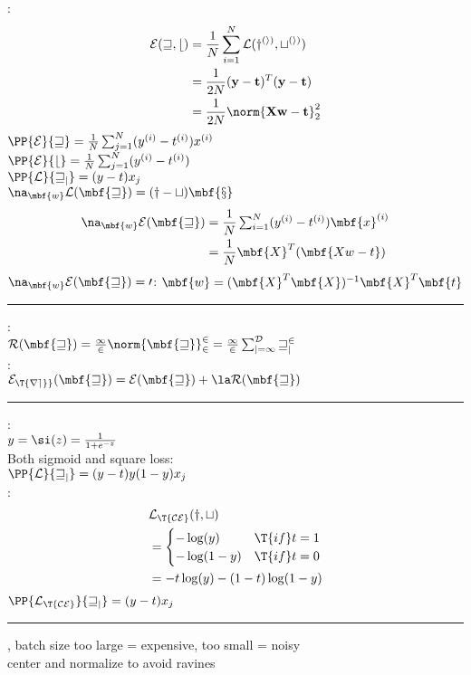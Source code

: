 \documentclass[10pt]{LatexTemplate/hw}
\begin{document}
\begin{multicols*}{5}
: \begin{align*}
    \cal{E}(w,b)&=\frac1N\sum_{i=1}^N \cal{L}(y^{(i)}, t^{(i)})\\
    &=\frac1{2N}(\mathbf{y}-\mathbf{t})^T(\mathbf{y}-\mathbf{t})\\
    &=\frac1{2N}\norm{\mathbf{Xw-t}}_2^2
\end{align*}
$\PP{\cal{E}}{w}=\frac1{N}\sum_{j=1}^N (y^{(i)}-t^{(i)})x^{(i)}$\\
$\PP{\cal{E}}{b}=\frac1{N}\sum_{j=1}^N (y^{(i)}-t^{(i)})$\\
$\PP{\cal{L}}{w_j}=(y-t)x_j$\\
$\na_\mbf{w} \cal{L}(\mbf{w}) = (y-t)\mbf{x}$
\begin{align*}
    \na_\mbf{w} \cal{E}(\mbf{w}) &= \frac1N \textstyle\sum_{i=1}^N (y^{(i)}-t^{(i)})\mbf{x}^{(i)}\\
    &= \frac1N \mbf{X}^T(\mbf{Xw-t})
\end{align*}
$\na_\mbf{w} \cal{E}(\mbf{w})=0$: $\mbf{w}=(\mbf{X}^T\mbf{X})^{-1}\mbf{X}^T\mbf{t}$\\
\rule{\linewidth}{0.4pt}
:\\ $\cal{R}(\mbf{w})=\frac12\norm{\mbf{w}}_2^2=\frac12\sum_{j=1}^D w_j^2$\\
:\\ $\cal{E}_{\T{reg}}(\mbf{w})=\cal{E}(\mbf{w})+\la\cal{R}(\mbf{w})$\\
\rule{\linewidth}{0.4pt}
:\\ $y=\si(z)=\frac1{1+e^{-z}}$\\
Both sigmoid and square loss:\\ $\PP{\cal{L}}{w_j}=(y-t)y(1-y)x_j$\\
: \begin{align*}
    &\cal{L}_{\T{CE}}(y,t)\\
    &=\begin{cases}
        -\log(y) & \T{if } t=1\\
        -\log(1-y) & \T{if } t=0
    \end{cases}\\
    &= -t\log(y)-(1-t)\log(1-y)
\end{align*}
$\PP{\cal{L}_{\T{CE}}}{w_j}=(y-t)x_j$\\
\rule{\linewidth}{0.4pt}
, batch size too large = expensive, too small = noisy\\
center and normalize to avoid ravines\\

\end{multicols*}
\end{document}
